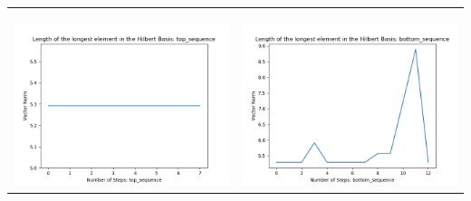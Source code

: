 \documentclass[10pt]{article}
\begin{document}
\begin{tabular}{c|c}
\begin{minipage}{.45\textwidth}
\end{minipage} \\ \\
\hline \\\begin{minipage}{.45\textwidth}
\includegraphics[width=\textwidth]{"DATA/5d/6 generators 2 bound J/top_sequence LENGTH"}
\end{minipage} &
\begin{minipage}{.45\textwidth}
\includegraphics[width=\textwidth]{"DATA/5d/6 generators 2 bound J bottomup/bottom_sequence LENGTH"}
\end{minipage}
\end{tabular}
\end{document}

